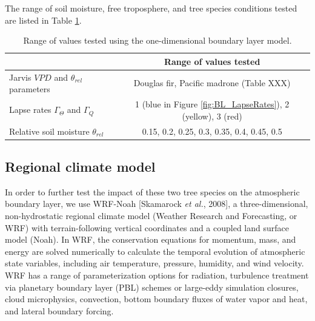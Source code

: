 The range of soil moisture, free troposphere, and tree species conditions tested are listed in Table \ref{table:BL_1Druns}.  

\begin{table}
\begin{tabular}{ l c }
\hline
 & Range of values tested \\ \hline
Jarvis $VPD$ and $\theta_{rel}$ parameters & Douglas fir, Pacific madrone (Table XXX)\\
Lapse rates $\Gamma_{\Theta}$ and $\Gamma_Q$ & 1 (blue in Figure \ref{fig:BL_LapseRates}), 2 (yellow), 3 (red)\\
Relative soil moisture $\theta_{rel}$ & 0.15, 0.2, 0.25, 0.3, 0.35, 0.4, 0.45, 0.5\\
\hline
\end{tabular}
\caption{Range of values tested using the one-dimensional boundary layer model.}
\label{table:BL_1Druns}
\end{table}

\subsection{Regional climate model}
\label{sec:BL_WRFdesc}
In order to further test the impact of these two tree species on the atmospheric boundary layer, we use WRF-Noah [Skamarock \textit{et al.}, 2008], a three-dimensional, non-hydrostatic regional climate model (Weather Research and Forecasting, or WRF) with terrain-following vertical coordinates and a coupled land surface model (Noah).  In WRF, the conservation equations for momentum, mass, and energy are solved numerically to calculate the temporal evolution of atmospheric state variables, including air temperature, pressure, humidity, and wind velocity.  WRF has a range of parameterization options for radiation, turbulence treatment via planetary boundary layer (PBL) schemes or large-eddy simulation closures, cloud microphysics, convection, bottom boundary fluxes of water vapor and heat, and lateral boundary forcing.  

